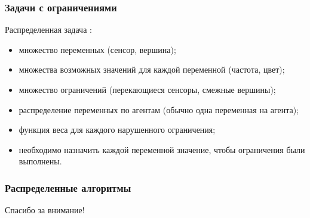 \documentclass{beamer}
\begin{document}
\begin{frame}
\frametitle{Задачи с ограничениями}
  Распределенная задача :
  \begin{itemize}
    \item множество переменных (сенсор, вершина);
    \item множества возможных значений для каждой переменной (частота, цвет);
    \item множество ограничений (перекающиеся сенсоры, смежные вершины);
    \item распределение переменных по агентам (обычно одна переменная на агента);
    \item<2-| alert@2> функция веса для каждого нарушенного ограничения;
    \item необходимо 
      {назначить каждой переменной значение, чтобы ограничения были выполнены}.
  \end{itemize}
\end{frame}

\begin{frame}
\frametitle{Распределенные алгоритмы}
  
\end{frame}

\begin{frame}{}
\addtocounter{framenumber}{-1}
\begin{center}
\LARGE{Спасибо за внимание!}
\end{center}
\end{frame}
\end{document}
